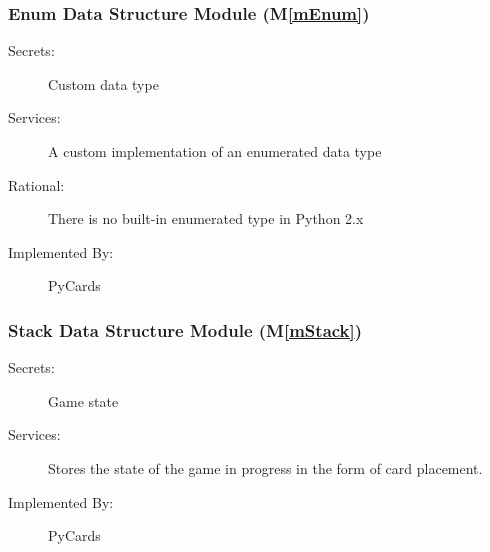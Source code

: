 \documentclass[12pt, titlepage]{article}
\newcommand{\mref}[1]{M\ref{#1}}
\begin{document}
	
	
	\subsubsection{Enum Data Structure Module (\mref{mEnum})}
	\begin{description}
		\item[Secrets:]Custom data type
		\item[Services:]A custom implementation of an enumerated data type
		\item[Rational:] There is no built-in enumerated type in Python 
		2.x			
		\item[Implemented By:] PyCards
	\end{description}
	\subsubsection{Stack Data Structure Module (\mref{mStack})}
	\begin{description}
		\item[Secrets:]Game state
		\item[Services:]Stores the state of the game in progress in the form of 
		card placement.
		\item[Implemented By:] PyCards
	\end{description}
	
	
	
\end{document}
